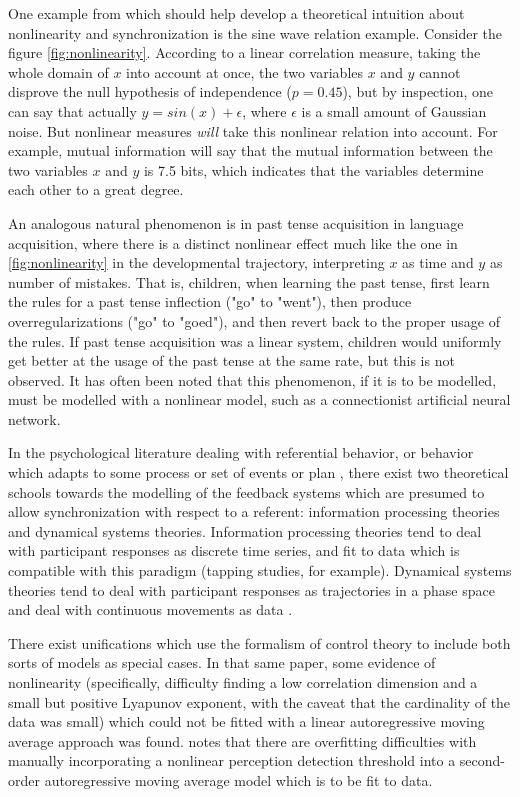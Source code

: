 \documentclass[12pt]{article}
\begin{document}
One example from \cite{anscombe} which should help develop a theoretical intuition about nonlinearity and synchronization is the sine wave relation example. Consider the figure \ref{fig:nonlinearity}. According to a linear correlation measure, taking the whole domain of $x$ into account at once, the two variables $x$ and $y$ cannot disprove the null hypothesis of independence ($p=0.45$), but by inspection, one can say that actually $y = sin(x) + \epsilon$, where $\epsilon$ is a small amount of Gaussian noise. But nonlinear measures \emph{will} take this nonlinear relation into account. For example, mutual information will say that the mutual information between the two variables $x$ and $y$ is 7.5 bits, which indicates that the variables determine each other to a great degree.

An analogous natural phenomenon is in past tense acquisition in language acquisition, where there is a distinct nonlinear effect much like the one in \ref{fig:nonlinearity} in the developmental trajectory, interpreting $x$ as time and $y$ as number of mistakes. That is, children, when learning the past tense, first learn the rules for a past tense inflection ("go" to "went"), then produce overregularizations ("go" to "goed"), and then revert back to the proper usage of the rules. If past tense acquisition was a linear system, children would uniformly get better at the usage of the past tense at the same rate, but this is not observed. It has often been noted that this phenomenon, if it is to be modelled, must be modelled with a nonlinear model, such as a connectionist artificial neural network. %

In the psychological literature dealing with referential behavior, or behavior which adapts to some process or set of events or plan \cite{pressing}, there exist two theoretical schools towards the modelling of the feedback systems which are presumed to allow synchronization with respect to a referent: information processing theories and dynamical systems theories. Information processing theories tend to deal with participant responses as discrete time series, and fit to data which is compatible with this paradigm (tapping studies, for example). Dynamical systems theories tend to deal with participant responses as trajectories in a phase space and deal with continuous movements as data \cite{syncreview}.

There exist unifications \cite{pressing} which use the formalism of control theory to include both sorts of models as special cases. In that same paper, some evidence of nonlinearity (specifically, difficulty finding a low correlation dimension and a small but positive Lyapunov exponent, with the caveat that the cardinality of the data was small) which could not be fitted with a linear autoregressive moving average approach was found. \cite{schulze} notes that there are overfitting difficulties with manually incorporating a nonlinear perception detection threshold into a second-order autoregressive moving average model which is to be fit to data.
\end{document}
